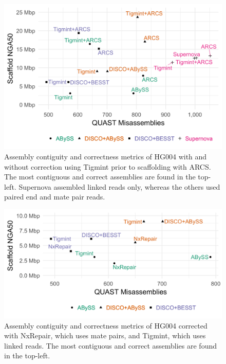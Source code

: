 \documentclass{bmcart}
\begin{document}
\begin{figure}[!htbp]
\hypertarget{fig:metrics}{%
\centering
\includegraphics[width=4.8in]{figures/metrics.png}
\caption{Assembly contiguity and correctness metrics of HG004 with and without correction using Tigmint prior to scaffolding with ARCS. The most contiguous and correct assemblies are found in the top-left. Supernova assembled linked reads only, whereas the others used paired end and mate pair reads.}\label{fig:metrics}
}
\end{figure}

\begin{figure}[!htbp]
\hypertarget{fig:nxrepair}{%
\centering
\includegraphics[width=4.8in]{figures/nxrepair.png}
\caption{Assembly contiguity and correctness metrics of HG004 corrected with NxRepair, which uses mate pairs, and Tigmint, which uses linked reads. The most contiguous and correct assemblies are found in the top-left.}\label{fig:nxrepair}
}
\end{figure}
\end{document}

